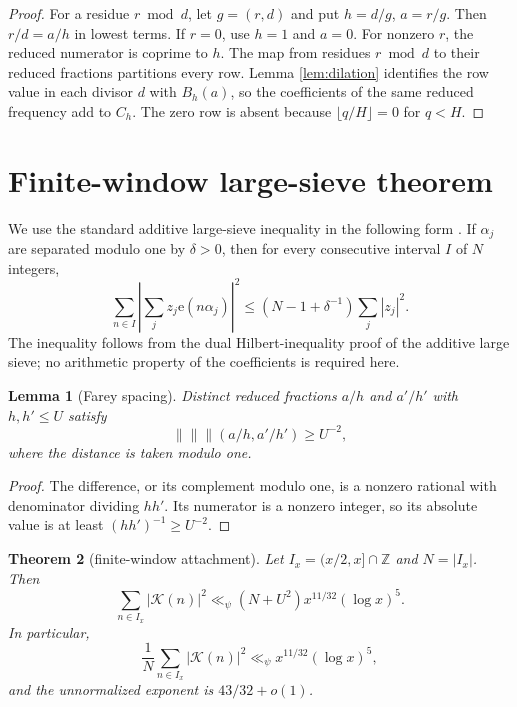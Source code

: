 \documentclass[11pt]{article}
\newtheorem{theorem}{Theorem}[section]
\newtheorem{lemma}[theorem]{Lemma}
\theoremstyle{definition}
\theoremstyle{remark}
\newcommand{\ZZ}{\mathbb Z}
\newcommand{\ee}{\mathrm e}
\newcommand{\Kphys}{\mathcal K}
\newcommand{\dist}{\|\!\|\!\|}
\begin{document}
\begin{proof}
For a residue $r\bmod d$, let $g=(r,d)$ and put $h=d/g$, $a=r/g$.
Then $r/d=a/h$ in lowest terms.  If $r=0$, use $h=1$ and $a=0$.
For nonzero $r$, the reduced numerator is coprime to $h$.  The map from
residues $r\bmod d$ to their reduced fractions partitions every row.  Lemma
\ref{lem:dilation} identifies the row value in each divisor $d$ with $B_h(a)$,
so the coefficients of the same reduced frequency add to $C_h$.  The zero row
is absent because $\lfloor q/H\rfloor=0$ for $q<H$.
\end{proof}

\section{Finite-window large-sieve theorem}

We use the standard additive large-sieve inequality in the following form
\cite{MontgomeryVaughan1973}.  If $\alpha_j$ are separated modulo one by
\(\delta>0\), then for every consecutive interval $I$ of $N$ integers,
\begin{equation}
 \sum_{n\in I}\left|\sum_j z_j\ee(n\alpha_j)\right|^2
 \le (N-1+\delta^{-1})\sum_j|z_j|^2.
 \label{eq:large-sieve}
\end{equation}
The inequality follows from the dual Hilbert-inequality proof of the additive
large sieve; no arithmetic property of the coefficients is required here.

\begin{lemma}[Farey spacing]
\label{lem:spacing}
Distinct reduced fractions $a/h$ and $a'/h'$ with $h,h'\le U$ satisfy
\[
 \dist(a/h,a'/h')\ge U^{-2},
\]
where the distance is taken modulo one.
\end{lemma}

\begin{proof}
The difference, or its complement modulo one, is a nonzero rational with
denominator dividing $hh'$.  Its numerator is a nonzero integer, so its
absolute value is at least $(hh')^{-1}\ge U^{-2}$.
\end{proof}

\begin{theorem}[finite-window attachment]
\label{thm:finite}
Let $I_x=(x/2,x]\cap\ZZ$ and $N=|I_x|$.  Then
\begin{equation}
 \sum_{n\in I_x}|\Kphys(n)|^2
 \ll_{\psi}(N+U^2)x^{11/32}(\log x)^5.
 \label{eq:finite-bound}
\end{equation}
In particular,
\begin{equation}
 \frac1N\sum_{n\in I_x}|\Kphys(n)|^2
 \ll_{\psi}x^{11/32}(\log x)^5,
 \label{eq:normalized-bound}
\end{equation}
and the unnormalized exponent is $43/32+o(1)$.
\end{theorem}
\end{document}
